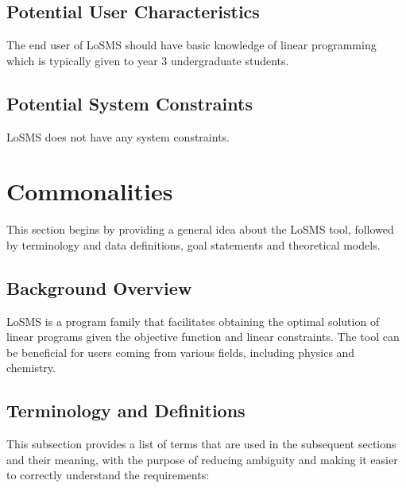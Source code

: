 \documentclass[12pt]{article}
\newcommand{\famname}{LoSMS} %
\begin{document}
\subsection{Potential User Characteristics} \label{SecUserCharacteristics}

The end user of \famname{} should have basic knowledge of linear programming  
which is typically given to year 3 undergraduate students.

\subsection{Potential System Constraints}

\famname{} does not have any system constraints.

\section{Commonalities} \label{Sec_Commonalities}

This section begins by providing a general idea about the \famname{} tool, 
followed by terminology and data definitions, goal statements and theoretical 
models.

\subsection{Background Overview} \label{Sec_Background}

\famname{} is a program family that facilitates obtaining the optimal solution 
of linear programs given the objective function and linear constraints. The 
tool can be beneficial for users coming from various fields, including physics 
and chemistry.

\subsection{Terminology and  Definitions}

This subsection provides a list of terms that are used in the subsequent
sections and their meaning, with the purpose of reducing ambiguity and making it
easier to correctly understand the requirements:
\end{document}
